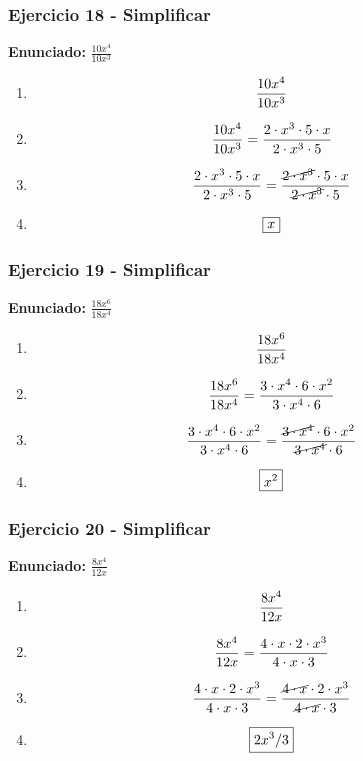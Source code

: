 \documentclass[11pt,a4paper]{article}
\newcommand{\fitmath}[1]{%
\[
\setbox0=\hbox{$\displaystyle #1$}%
\ifdim\wd0>\linewidth
\resizebox{\linewidth}{!}{$\displaystyle #1$}%
\else
#1%
\fi
\]
}
\begin{document}
\vspace{0.12cm}
\subsubsection*{Ejercicio 18 - Simplificar}
\textbf{Enunciado:} $ \frac{10 x^{4}}{10 x^{3}} $\par
\begin{enumerate}[leftmargin=2em]
\item \fitmath{\frac{10 x^{4}}{10 x^{3}}}
\item \fitmath{\frac{10 x^{4}}{10 x^{3}}=\frac{2\cdot x^{3}\cdot 5\cdot x}{2\cdot x^{3}\cdot 5}}
\item \fitmath{\frac{2\cdot x^{3}\cdot 5\cdot x}{2\cdot x^{3}\cdot 5}=\frac{\cancel{2\cdot x^{3}}\cdot 5\cdot x}{\cancel{2\cdot x^{3}}\cdot 5}}
\item \fitmath{\boxed{x}}
\end{enumerate}

\vspace{0.12cm}
\subsubsection*{Ejercicio 19 - Simplificar}
\textbf{Enunciado:} $ \frac{18 x^{6}}{18 x^{4}} $\par
\begin{enumerate}[leftmargin=2em]
\item \fitmath{\frac{18 x^{6}}{18 x^{4}}}
\item \fitmath{\frac{18 x^{6}}{18 x^{4}}=\frac{3\cdot x^{4}\cdot 6\cdot x^{2}}{3\cdot x^{4}\cdot 6}}
\item \fitmath{\frac{3\cdot x^{4}\cdot 6\cdot x^{2}}{3\cdot x^{4}\cdot 6}=\frac{\cancel{3\cdot x^{4}}\cdot 6\cdot x^{2}}{\cancel{3\cdot x^{4}}\cdot 6}}
\item \fitmath{\boxed{x^{2}}}
\end{enumerate}

\vspace{0.12cm}
\subsubsection*{Ejercicio 20 - Simplificar}
\textbf{Enunciado:} $ \frac{8 x^{4}}{12 x} $\par
\begin{enumerate}[leftmargin=2em]
\item \fitmath{\frac{8 x^{4}}{12 x}}
\item \fitmath{\frac{8 x^{4}}{12 x}=\frac{4\cdot x\cdot 2\cdot x^{3}}{4\cdot x\cdot 3}}
\item \fitmath{\frac{4\cdot x\cdot 2\cdot x^{3}}{4\cdot x\cdot 3}=\frac{\cancel{4\cdot x}\cdot 2\cdot x^{3}}{\cancel{4\cdot x}\cdot 3}}
\item \fitmath{\boxed{2 x^{3} / 3}}
\end{enumerate}
\end{document}
